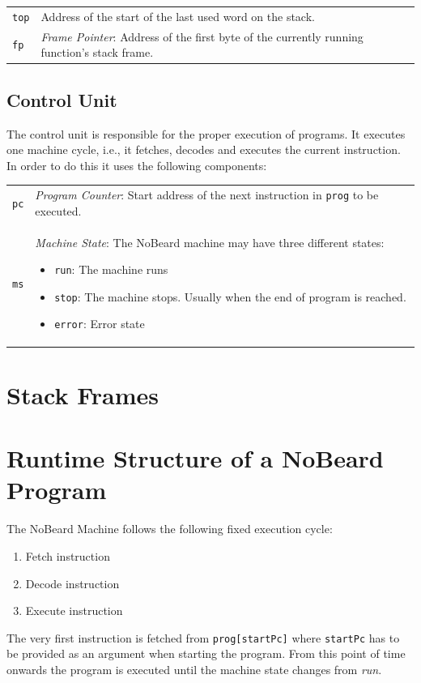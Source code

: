 \documentclass[11pt]{report}
\newcommand{\leongage}{NoBeard}
\begin{document}
\begin{tabular}{p{}p{}}		
	\lstinline$top$ & Address of the start of the last used word on the stack. \\
	\lstinline$fp$ & {\em Frame Pointer}: Address of the first byte of the currently running function's stack frame. \\
\end{tabular}

\subsection{Control Unit}
The control unit is responsible for the proper execution of programs. It executes one machine cycle, i.e., it fetches, decodes and executes the current instruction. In order to do this it uses the following components:

\begin{tabular}{p{}p{}}		
	\lstinline$pc$ & {\em Program Counter}: Start address of the next instruction in \lstinline$prog$ to be executed.\\
	\lstinline$ms$ & {\em Machine State}: The \leongage{} machine may have three different states:
	\begin{itemize}
		\item \lstinline$run$: The machine runs
		\item \lstinline$stop$: The machine stops. Usually when the end of program is reached.
		\item \lstinline$error$: Error state
	\end{itemize}
\end{tabular}

\section{Stack Frames}\label{sec:stackframes}

\section{Runtime Structure of a \leongage{} Program}
The \leongage{} Machine follows the following fixed execution cycle:
\begin{enumerate}
	\item Fetch instruction
	\item Decode instruction
	\item Execute instruction
\end{enumerate}
The very first instruction is fetched from {\tt prog[startPc]} where {\tt startPc} has to be provided as an argument when starting the program. From this point of time onwards the program is executed until the machine state changes from {\em run}.
\end{document}
